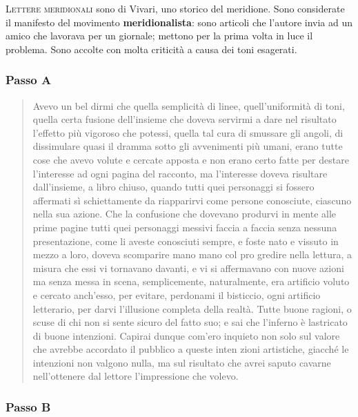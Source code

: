 \documentclass{book}
\begin{document}
\textsc{Lettere meridionali} sono di Vivari, uno storico del meridione.
Sono considerate il manifesto del movimento \textbf{meridionalista}:
sono articoli che l'autore invia ad un amico che lavorava per un
giornale; mettono per la prima volta in luce il problema. Sono accolte
con molta criticità a causa dei toni esagerati.

\subsubsection{Passo A}

\begin{quote}
Avevo un bel dirmi che quella semplicità di linee, quell'uniformità di toni, quella certa fusione dell'insieme che doveva servirmi a dare nel risultato l'effetto più vigoroso che potessi, quella tal cura di smussare gli angoli, di dissimulare quasi il dramma sotto gli avvenimenti più umani, erano tutte cose che avevo volute e cercate apposta e non erano certo fatte per destare l'interesse ad ogni pagina del racconto, ma l'interesse doveva risultare dall'insieme, a libro chiuso, quando tutti quei personaggi si fossero affermati sì schiettamente da riapparirvi come persone conosciute, ciascuno nella sua azione. Che la confusione che dovevano produrvi in mente alle prime pagine tutti quei personaggi messivi faccia a faccia senza nessuna presentazione, come li aveste conosciuti sempre, e foste nato e vissuto in mezzo a loro, doveva scomparire mano mano col pro gredire nella lettura, a misura che essi vi tornavano davanti, e vi si affermavano con nuove azioni ma senza messa in scena, semplicemente, naturalmente, era artificio voluto e cercato anch'esso, per evitare, perdonami il bisticcio, ogni artificio letterario, per darvi l'illusione completa della realtà. Tutte buone ragioni, o scuse di chi non si sente sicuro del fatto suo; e sai che l'inferno è lastricato di buone intenzioni. Capirai dunque com'ero inquieto non solo sul valore che avrebbe accordato il pubblico a queste inten zioni artistiche, giacché le intenzioni non valgono nulla, ma sul risultato che avrei saputo cavarne nell'ottenere dal lettore l'impressione che volevo.
\end{quote}

\subsubsection{Passo B}
\end{document}
